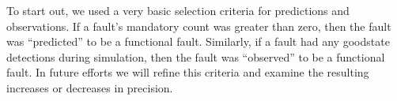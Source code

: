     To start out, we used a very basic selection criteria for predictions and observations.
    If a fault's mandatory count was greater than zero, then the fault was ``predicted'' to be a functional fault.
    Similarly, if a fault had any goodstate detections during simulation, then the fault was ``observed'' to be a functional fault.
    In future efforts we will refine this criteria and examine the resulting increases or decreases in precision.

